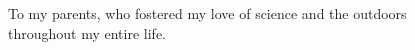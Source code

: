 \cleardoublepage
{}
{}
\vspace*{.1\textheight}
\begin{center}
  To my parents, who fostered my love of science and the outdoors \\ throughout my entire life.
\end{center}
